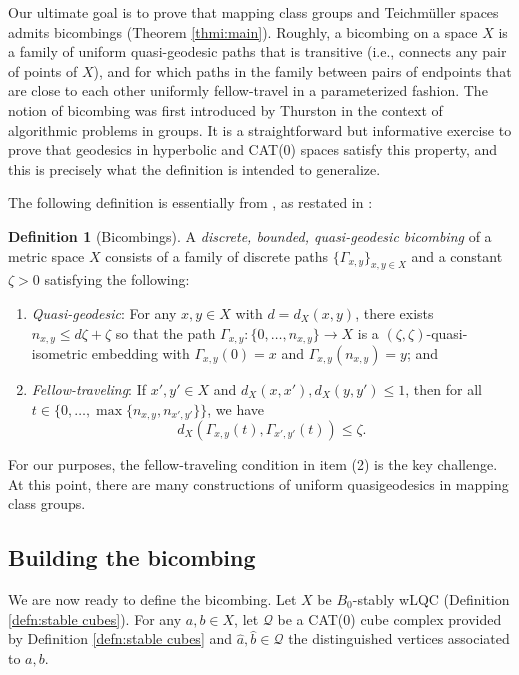 \documentclass{amsart}
\theoremstyle{definition}
\newtheorem{definition}[theorem]{Definition}
\theoremstyle{remark}
\theoremstyle{definition}
\newcommand{\calQ}{\mathcal{Q}}
\newcommand{\ha}{\hat{a}}
\newcommand{\hb}{\hat{b}}
\begin{document}
Our ultimate goal is to prove that mapping class groups and Teichm\"uller spaces admits bicombings (Theorem \ref{thmi:main}).  Roughly, a bicombing on a space $X$ is a family of uniform quasi-geodesic paths that is transitive (i.e., connects any pair of points of $X$), and for which paths in the family between pairs of endpoints that are close to each other uniformly fellow-travel in a parameterized fashion.   The notion of bicombing was first introduced by Thurston in the context of algorithmic problems in groups.  It is a straightforward but informative exercise to prove that geodesics in hyperbolic and CAT(0) spaces satisfy this property, and this is precisely what the definition is intended to generalize.

\smallskip
The following definition is essentially from \cite{AB95}, as restated in \cite[Definition 6.4]{DMS_bary}:  

\begin{definition}[Bicombings]\label{defn:bicombing}
A \emph{discrete, bounded, quasi-geodesic bicombing} of a metric space $X$ consists of a family of discrete paths $\{\Gamma_{x,y}\}_{x,y \in X}$ and a constant $\zeta>0$ satisfying the following:
\begin{enumerate}
\item \emph{Quasi-geodesic}: For any $x,y \in X$ with $d = d_{X}(x,y)$, there exists $n_{x,y} \leq d\zeta + \zeta$ so that the path $\Gamma_{x,y}:\{0, \dots, n_{x,y}\} \rightarrow X$ is a $(\zeta,\zeta)$-quasi-isometric embedding with $\Gamma_{x,y}(0)=x$ and $\Gamma_{x,y}(n_{x,y}) = y$; and
\item \emph{Fellow-traveling}: If $x',y' \in X$ and $d_X(x,x'), d_X(y,y') \leq 1$, then for all $t \in \{0, \dots, \max\{n_{x,y}, n_{x',y'}\}\}$, we have
$$d_X(\Gamma_{x,y}(t), \Gamma_{x',y'}(t)) \leq \zeta.$$
\end{enumerate}


For our purposes, the fellow-traveling condition in item (2) is the key challenge.  At this point, there are many constructions of uniform quasigeodesics in mapping class groups.


\end{definition}

\subsection{Building the bicombing}\label{subsec:building bicombing}

We are now ready to define the bicombing.  Let $X$ be $B_0$-stably wLQC (Definition \ref{defn:stable cubes}).  For any $a,b \in X$, let $\calQ$ be a CAT(0) cube complex provided by Definition \ref{defn:stable cubes} and $\ha,\hb\in \calQ$ the distinguished vertices associated to $a,b$.
\end{document}
